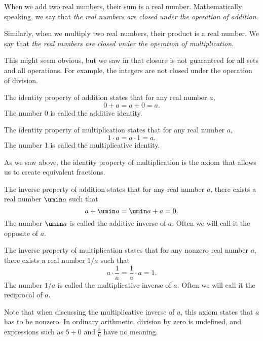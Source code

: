 \begin{boxdef2col}
\raggedright %
When we add two real numbers, their sum is a real number. Mathematically speaking, we say that \textit{the real numbers are closed under the operation of addition}.
\tcblower
\raggedright %
Similarly, when we multiply two real numbers, their product is a real number. We say that \textit{the real numbers are closed under the operation of multiplication}.
\end{boxdef2col}

This might seem obvious, but we saw in  that closure is not guaranteed for all sets and all operations. For example, the integers are not closed under the operation of division.

\begin{boxdef2col}
\raggedright %
The \gls{identity property of addition} states that for any real number $a$, \[0 + a = a + 0 = a.\] The number 0 is called the \gls{additive identity}.
\tcblower
\raggedright %
The \gls{identity property of multiplication} states that for any real number $a$, \[1 \cdot a = a \cdot 1 = a.\] The number 1 is called the \gls{multiplicative identity}.
\end{boxdef2col}

As we saw above, the identity property of multiplication is the axiom that allows us to create equivalent fractions.

\begin{boxdef2col}
\raggedright %
The \gls{inverse property of addition} states that for any real number $a$, there exists a real number $\umin a$ such that \[a + \umin a = \umin a + a = 0.\] The number $\umin a$ is called the \gls{additive inverse} of $a$. Often we will call it the \gls{opposite} of $a$.
\tcblower
\raggedright %
The \gls{inverse property of multiplication} states that for any nonzero real number $a$, there exists a real number $1/a$ such that \[a \cdot \frac{1}{a} = \frac{1}{a} \cdot a = 1.\] The number $1/a$ is called the \gls{multiplicative inverse} of $a$. Often we will call it the \gls{reciprocal} of $a$.
\end{boxdef2col}


Note that when discussing the multiplicative inverse of $a$, this axiom states that $a$ has to be nonzero. In ordinary arithmetic, division by zero is undefined, and expressions such as $5 \div 0$ and $\frac{5}{0}$ have no meaning.


